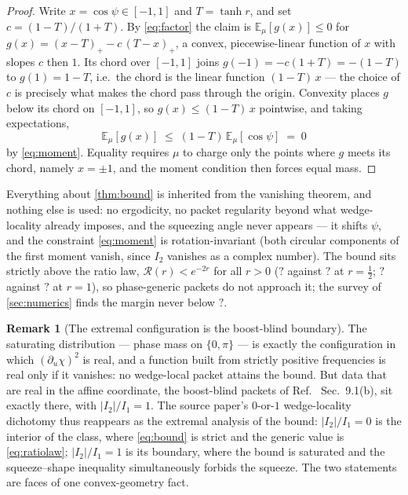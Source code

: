 \documentclass[11pt,a4paper]{article}
\newcommand{\NFBoundHalf}{?}\newcommand{\NFBoundOne}{?}
\newcommand{\NFBoundMarginMin}{?}\newcommand{\NFDevContour}{?}
\newcommand{\NFRatioHalf}{?}\newcommand{\NFRatioOne}{?}
\theoremstyle{plain}
\theoremstyle{definition}
\newtheorem{remark}{Remark}
\begin{document}
\begin{proof}
Write $x = \cos\psi \in [-1,1]$ and $T = \tanh r$, and set
$c = (1-T)/(1+T)$. By \cref{eq:factor} the claim is
$\mathbb{E}_\mu[g(x)] \le 0$ for
$g(x) = (x - T)_+ - c\,(T - x)_+$, a convex, piecewise-linear function of
$x$ with slopes $c$ then $1$. Its chord over $[-1, 1]$ joins
$g(-1) = -c(1+T) = -(1-T)$ to $g(1) = 1 - T$, i.e.\ the chord is the linear
function $(1-T)\,x$ --- the choice of $c$ is precisely what makes the chord
pass through the origin. Convexity places $g$ below its chord on $[-1,1]$,
so $g(x) \le (1-T)\,x$ pointwise, and taking expectations,
%
\begin{equation}
\mathbb{E}_\mu[g(x)] \;\le\; (1-T)\,\mathbb{E}_\mu[\cos\psi] \;=\; 0
\end{equation}
%
by \cref{eq:moment}. Equality requires $\mu$ to charge only the points where
$g$ meets its chord, namely $x = \pm 1$, and the moment condition then
forces equal mass.
\end{proof}

Everything about \cref{thm:bound} is inherited from the vanishing theorem,
and nothing else is used: no ergodicity, no packet regularity beyond what
wedge-locality already imposes, and the squeezing angle never appears --- it
shifts $\psi$, and the constraint \cref{eq:moment} is rotation-invariant
(both circular components of the first moment vanish, since $I_2$ vanishes
as a complex number). The bound sits strictly above the ratio law,
$\mathcal{R}(r) < e^{-2r}$ for all $r > 0$ ($\NFRatioHalf$ against
$\NFBoundHalf$ at $r = \tfrac12$; $\NFRatioOne$ against $\NFBoundOne$ at
$r = 1$), so phase-generic packets do not approach it; the survey of
\cref{sec:numerics} finds the margin never below $\NFBoundMarginMin$.

\begin{remark}[The extremal configuration is the boost-blind boundary]
The saturating distribution --- phase mass on $\{0, \pi\}$ --- is exactly
the configuration in which $(\partial_u\chi)^2$ is real, and a function
built from strictly positive frequencies is real only if it vanishes: no
wedge-local packet attains the bound. But data that are real in the affine
coordinate, the boost-blind packets of Ref.~\cite{NariaiI} Sec.~9.1(b), sit
exactly there, with $|I_2|/I_1 = 1$. The source paper's $0$-or-$1$
wedge-locality dichotomy thus reappears as the extremal analysis of the
bound: $|I_2|/I_1 = 0$ is the interior of the class, where
\cref{eq:bound} is strict and the generic value is \cref{eq:ratiolaw};
$|I_2|/I_1 = 1$ is its boundary, where the bound is saturated and the
squeeze--shape inequality simultaneously forbids the squeeze. The two
statements are faces of one convex-geometry fact.
\end{remark}
\end{document}
